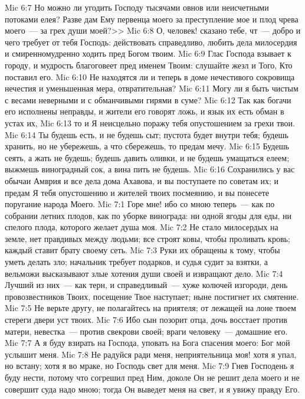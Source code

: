 \vs Mic 6:7 Но можно ли угодить Господу тысячами овнов или неисчетными потоками елея? Разве дам Ему первенца моего за преступление мое и плод чрева моего~--- за грех души моей?>>
\vs Mic 6:8 О, человек! сказано тебе, чт~--- добро и чего требует от тебя Господь: действовать справедливо, любить дела милосердия и смиренномудренно ходить пред Богом твоим.
\vs Mic 6:9 Глас Господа взывает к городу, и мудрость благоговеет пред именем Твоим: слушайте жезл и Того, Кто поставил его.
\vs Mic 6:10 Не находятся ли и теперь в доме нечестивого сокровища нечестия и уменьшенная мера, отвратительная?
\vs Mic 6:11 Могу ли я быть чистым с весами неверными и с обманчивыми гирями в суме?
\vs Mic 6:12 Так как богачи его исполнены неправды, и жители его говорят ложь, и язык их есть обман в устах их,
\vs Mic 6:13 то и Я неисцельно поражу тебя опустошением за грехи твои.
\vs Mic 6:14 Ты будешь есть, и не будешь сыт; пустота будет внутри тебя; будешь хранить, но не убережешь, а что сбережешь, то предам мечу.
\vs Mic 6:15 Будешь сеять, а жать не будешь; будешь давить оливки, и не будешь умащаться елеем; выжмешь виноградный сок, а вина пить не будешь.
\vs Mic 6:16 Сохранились у вас обычаи Амврия и все дела дома Ахавова, и вы поступаете по советам их; и предам Я тебя опустошению и жителей твоих посмеянию, и вы понесете поругание народа Моего.
\vs Mic 7:1 Горе мне! ибо со мною теперь~--- как по собрании летних плодов, как по уборке винограда: ни одной ягоды для еды, ни спелого плода, которого желает душа моя.
\vs Mic 7:2 Не стало милосердых на земле, нет правдивых между людьми; все строят ковы, чтобы проливать кровь; каждый ставит брату своему сеть.
\vs Mic 7:3 Руки их обращены к тому, чтобы уметь делать зло; начальник требует подарков, и судья судит за взятки, а вельможи высказывают злые хотения души своей и извращают дело.
\vs Mic 7:4 Лучший из них~--- как терн, и справедливый~--- хуже колючей изгороди, день провозвестников Твоих, посещение Твое наступает; ныне постигнет их смятение.
\vs Mic 7:5 Не верьте другу, не полагайтесь на приятеля; от лежащей на лоне твоем стереги двери уст твоих.
\vs Mic 7:6 Ибо сын позорит отца, дочь восстает против матери, невестка~--- против свекрови своей; враги человеку~--- домашние его.
\vs Mic 7:7 А я буду взирать на Господа, уповать на Бога спасения моего: Бог мой услышит меня.
\vs Mic 7:8 Не радуйся ради меня, неприятельница моя! хотя я упал, но встану; хотя я во мраке, но Господь свет для меня.
\vs Mic 7:9 Гнев Господень я буду нести, потому что согрешил пред Ним, доколе Он не решит дела моего и не совершит суда надо мною; тогда Он выведет меня на свет, и я увижу правду Его.
